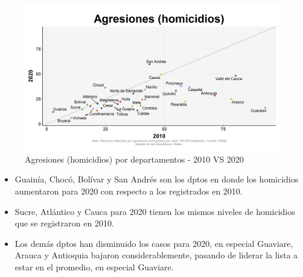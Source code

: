     \begin{figure}[H]
        \caption{Agresiones (homicidios) por departamentos - 2010 VS 2020 \label{map_result_2} }
        \begin{center}
        \includegraphics[width=\textwidth,keepaspectratio]{img/var_286_scatter_time.png}
        \end{center}
    \end{figure}
            \begin{itemize}
                \item Guainía, Chocó, Bolívar y San Andrés son los dptos en donde los homicidios aumentaron para 2020 con respecto a los registrados en 2010.
                \item Sucre, Atlántico y Cauca para 2020 tienen los mismos niveles de homicidios  que se registraron en 2010.
                \item Los demás dptos han disminuido los casos para 2020, en especial Guaviare, Arauca y Antioquia bajaron considerablemente, pasando de liderar la lista a estar en el promedio, en especial Guaviare. 
                \end{itemize}

